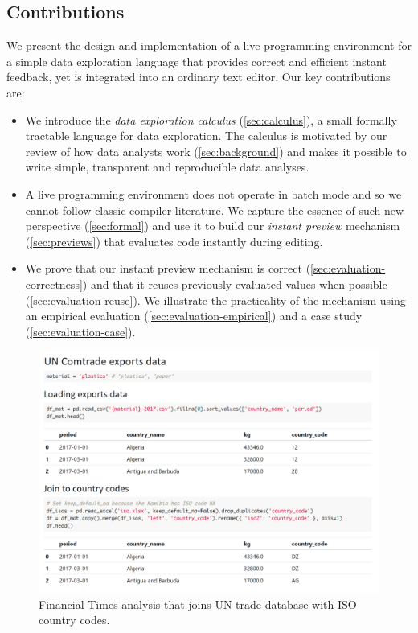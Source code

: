\documentclass[english,crc,references=cleveref]{programming}
\theoremstyle{plain}
\theoremstyle{definition}
\begin{document}
\subsection*{Contributions}
We present the design and implementation of a live programming environment for a simple data exploration
language that provides correct and efficient instant feedback, yet is integrated into an
ordinary text editor. Our key contributions are:

\begin{itemize}
\item We introduce the \emph{data exploration calculus} (\cref{sec:calculus}), a small formally
  tractable language for data exploration. The calculus is motivated by our review
  of how data analysts work (\cref{sec:background}) and makes it possible to write simple,
  transparent and reproducible data analyses.

\item A live programming environment does not operate in batch mode and so we cannot follow classic
  compiler literature. We capture the essence of such new perspective (\cref{sec:formal})
  and use it to build our \emph{instant preview} mechanism (\cref{sec:previews}) that evaluates
  code instantly during editing.

\item We prove that our instant preview mechanism is correct (\cref{sec:evaluation-correctness}) and that
  it reuses previously evaluated values when possible (\cref{sec:evaluation-reuse}). We
  illustrate the practicality of the mechanism using an empirical evaluation
  (\cref{sec:evaluation-empirical}) and a case study (\cref{sec:evaluation-case}).
\end{itemize}


\begin{figure}
  \begin{wide}
    \includegraphics[width=\linewidth]{figures/notebook}
  \end{wide}
  \caption{Financial Times analysis that joins UN trade database with ISO country codes.}
\label{fig:ft-uncomtrade}
\end{figure}
\end{document}

